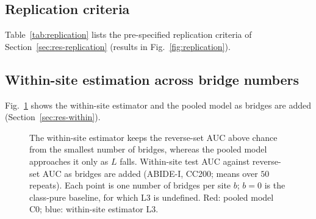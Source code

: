 \subsection{Replication criteria}

Table~\ref{tab:replication} lists the pre-specified replication criteria of Section~\ref{sec:res-replication} (results in Fig.~\ref{fig:replication}).

\begin{table}[h]
\centering
\caption{Pre-specified replication criteria on ABIDE-II (Gordon atlas, $n=20$) and ADHD-200 (CC200, $n=20$, $k=1$ only). n.a.: not assessable in this cohort.}
\label{tab:replication}
\end{table}

\subsection{Within-site estimation across bridge numbers}

Fig.~\ref{fig:tradeoff} shows the within-site estimator and the pooled model as bridges are added (Section~\ref{sec:res-within}).

\begin{figure}[h]
\centering
{}
\caption{The within-site estimator keeps the reverse-set AUC above chance from the smallest number of bridges, whereas the pooled model approaches it only as $L$ falls. Within-site test AUC against reverse-set AUC as bridges are added (ABIDE-I, CC200; means over $50$ repeats). Each point is one number of bridges per site $b$; $b=0$ is the class-pure baseline, for which L3 is undefined. Red: pooled model C0; blue: within-site estimator L3.}
\label{fig:tradeoff}
\end{figure}

